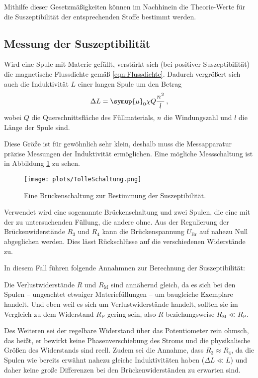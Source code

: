     Mithilfe dieser Gesetzmäßigkeiten können im Nachhinein die Theorie-Werte für die Suszeptibilität der entsprechenden Stoffe bestimmt werden. 

\subsection{Messung der Suszeptibilität}
\label{sub:messmethode}

    Wird eine Spule mit Materie gefüllt, verstärkt sich (bei positiver Suszeptibilität) die magnetische Flussdichte gemäß \eqref{eqn:Flussdichte}. 
    Dadurch vergrößert sich auch die Induktivität $L$ einer langen Spule um den Betrag 
    \begin{equation}
        \Delta L=\symup{\mu}_0 \chi Q \frac{n^2}{l} \,,
    \end{equation}
    wobei $Q$ die Querschnittsfläche des Füllmaterials, $n$ die Windungszahl und $l$ die Länge der Spule  sind. 

    Diese Größe ist für gewöhnlich sehr klein, deshalb muss die Messapparatur präzise Messungen der Induktivität ermöglichen.
    Eine mögliche Messschaltung ist in Abbildung \ref{fig:TolleSchaltung} zu sehen.
    \begin{figure}
        \centering 
        \texttt{[image: plots/TolleSchaltung.png]}
        \caption{Eine Brückenschaltung zur Bestimmung der Suszeptibilität\cite{Versuchsanleitung}.}
        \label{fig:TolleSchaltung}
    \end{figure}
    Verwendet wird eine sogenannte Brückenschaltung und zwei Spulen, die eine mit der zu untersuchenden Füllung, 
    die andere ohne. 
    Aus der Regulierung der Brückenwiderstände $R_3$ und $R_4$ kann die Brückenspannung $U_\text{Br}$ auf nahezu Null abgeglichen werden. 
    Dies lässt Rückschlüsse auf die verschiedenen Widerstände zu. 

    In diesem Fall führen folgende Annahmnen zur Berechnung der Suszeptibilität:

    Die Verlustwiderstände $R$ und $R_\text{M}$ sind annähernd gleich, da es sich bei den Spulen -- ungeachtet etwaiger 
    Materiefüllungen -- um baugleiche Exemplare handelt. 
    Und eben weil es sich um Verlustwiderstände handelt, sollten sie im Vergleich zu dem Widerstand $R_\text{P}$ gering sein, 
    also $R$ beziehungsweise $R_\text{M}\ll R_\text{P}$. 

    Des Weiteren sei der regelbare Widerstand über das Potentiometer rein ohmsch, das heißt, er bewirkt keine Phasenverschiebung des Stroms
    und die physikalische Größen des Widerstands sind reell. 
    Zudem sei die Annahme, dass $R_3\approx R_4$, da die Spulen wie bereits erwähnt nahezu gleiche Induktivitäten haben 
    ($\Delta L \ll L$) und daher keine große Differenzen bei den Brückenwiderständen zu erwarten sind. 

